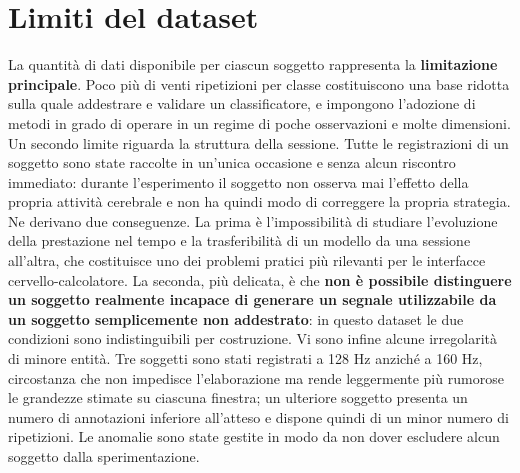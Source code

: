 \section{Limiti del dataset}
La quantità di dati disponibile per ciascun soggetto rappresenta la \textbf{limitazione principale}. Poco più di venti ripetizioni per classe costituiscono una base ridotta sulla quale addestrare e validare un classificatore, e impongono l’adozione di metodi in grado di operare in un regime di poche osservazioni e molte dimensioni.
Un secondo limite riguarda la struttura della sessione. Tutte le registrazioni di un soggetto sono state raccolte in un’unica occasione e senza alcun riscontro immediato: durante l’esperimento il soggetto non osserva mai l’effetto della propria attività cerebrale e non ha quindi modo di correggere la propria strategia. Ne derivano due conseguenze. La prima è l’impossibilità di studiare l’evoluzione della prestazione nel tempo e la trasferibilità di un modello da una sessione all’altra, che costituisce uno dei problemi pratici più rilevanti per le interfacce cervello-calcolatore. La seconda, più delicata, è che \textbf{non è possibile distinguere un soggetto realmente incapace di generare un segnale utilizzabile da un soggetto semplicemente non addestrato}: in questo dataset le due condizioni sono indistinguibili per costruzione.
Vi sono infine alcune irregolarità di minore entità. Tre soggetti sono stati registrati a 128 Hz anziché a 160 Hz, circostanza che non impedisce l’elaborazione ma rende leggermente più rumorose le grandezze stimate su ciascuna finestra; un ulteriore soggetto presenta un numero di annotazioni inferiore all’atteso e dispone quindi di un minor numero di ripetizioni. Le anomalie sono state gestite in modo da non dover escludere alcun soggetto dalla sperimentazione.  
